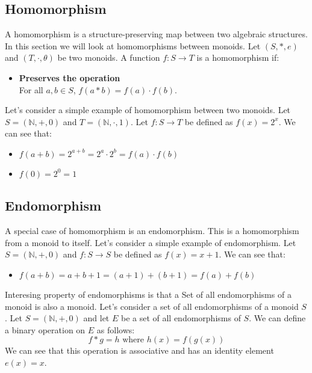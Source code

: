 \documentclass{article}
\begin{document}
\subsection{Homomorphism}
A homomorphism is a structure-preserving map between two algebraic structures.
In this section we will look at homomorphisms between monoids.
Let \( (S, \ast, e) \) and \( (T, \cdot, \theta) \) be two monoids.
A function \( f: S \to T \) is a homomorphism if:
\begin{itemize}
    \item \textbf{Preserves the operation} \\
    For all \( a, b \in S \), \( f(a \ast b) = f(a) \cdot f(b) \).
\end{itemize}
Let's consider a simple example of homomorphism between two monoids.
Let \( S = (\mathbb{N}, +, 0) \) and \( T = (\mathbb{N}, \cdot, 1) \).
Let \( f: S \to T \) be defined as \( f(x) = 2^x \).
We can see that:
\begin{itemize}
    \item \( f(a + b) = 2^{a + b} = 2^a \cdot 2^b = f(a) \cdot f(b) \)
    \item \( f(0) = 2^0 = 1 \)
\end{itemize}
\subsection{Endomorphism}
A special case of homomorphism is an endomorphism.
This is a homomorphism from a monoid to itself.
Let's consider a simple example of endomorphism.
Let \( S = (\mathbb{N}, +, 0) \) and \( f: S \to S \) be defined as \( f(x) = x + 1 \).
We can see that:
\begin{itemize}
    \item \( f(a + b) = a + b + 1 = (a + 1) + (b + 1) = f(a) + f(b) \)
\end{itemize}
Interesing property of endomorphisms is that a Set of all endomorphisms of a monoid is also a monoid.
Let's consider a set of all endomorphisms of a monoid \( S \).
Let \( S = (\mathbb{N}, +, 0) \) and let \( E \) be a set of all endomorphisms of \( S \).
We can define a binary operation on \( E \) as follows:
\begin{equation}
    f \ast g = h \text{ where } h(x) = f(g(x))
\end{equation}
We can see that this operation is associative and has an identity element \( e(x) = x \).
\end{document}
